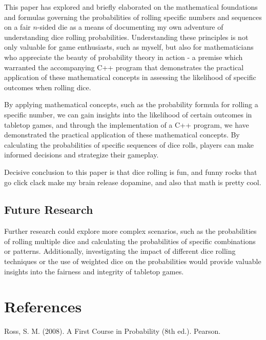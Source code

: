 \documentclass{article}
\begin{document}
This paper has explored and briefly elaborated on the mathematical foundations and formulas governing the
probabilities of rolling specific numbers and sequences on a fair $n$-sided die as a means of documenting my own
adventure of understanding dice rolling probabilities. Understanding these principles is not only valuable for
game enthusiasts, such as myself, but also for mathematicians who appreciate the beauty of probability theory
in action - a premise which warranted the accompanying C++ program that demonstrates the practical
application of these mathematical concepts in assessing the likelihood of specific outcomes when rolling dice.

By applying mathematical concepts, such as the probability formula for rolling a specific number, we can gain
insights into the likelihood of certain outcomes in tabletop games, and through the implementation of a C++
program, we have demonstrated the practical application of these mathematical concepts. By calculating the
probabilities of specific sequences of dice rolls, players can make informed decisions and strategize their gameplay.

Decisive conclusion to this paper is that dice rolling is fun, and funny rocks that go click clack make my brain
release dopamine, and also that math is pretty cool.

\subsection{Future Research}

Further research could explore more complex scenarios, such as the probabilities of rolling multiple dice and
calculating the probabilities of specific combinations or patterns. Additionally, investigating the impact of
different dice rolling techniques or the use of weighted dice on the probabilities would provide valuable insights
into the fairness and integrity of tabletop games.

\section{References}

\begin{thebibliography}{2}
 Ross, S. M. (2008). A First Course in Probability (8th ed.). Pearson.
\end{thebibliography}
\end{document}

